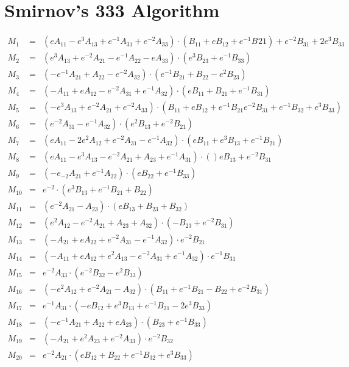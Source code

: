 \documentclass{article}
\begin{document}
\section{Smirnov's 333 Algorithm \cite{Smirnov13}}
\begin{eqnarray*}
M_1 &=& (eA_{11}-e^3A_{13}+e^{-1}A_{31}+e^{-2}A_{33})\cdot(B_{11}+eB_{12}+e^{-1}B_{}21)+e^{-2}B_{31}+2e^3B_{33}\\
M_2 &=& (e^3A_{13}+e^{-2}A_{21}-e^{-1}A_{22}-eA_{33})\cdot(e^3B_{23}+e^{-1}B_{33})\\
M_3 &=& (-e^{-1}A_{21}+A_{22}-e^{-2}A_{32})\cdot(e^{-1}B_{21}+B_{22}-e^2B_{23})\\
M_4 &=& (-A_{11}+eA_{12}-e^{-2}A_{31}+e^{-1}A_{32})\cdot(eB_{11}+B_{21}+e^{-1}B_{31})\\
M_5 &=& (-e^3A_{13}+e^{-2}A_{21}+e^{-2}A_{33})\cdot(B_{11}+eB_{12}+e^{-1}B_{21}e^{-2}B_{31}+e^{-1}B_{32}+e^3B_{33})\\
M_6 &=& (e^{-2}A_{31}-e^{-1}A_{32})\cdot(e^2B_{13}+e^{-2}B_{21})\\
M_7 &=& (eA_{11}-2e^2A_{12}+e^{-2}A_{31}-e^{-1}A_{32})\cdot(eB_{11}+e^3B_{13}+e^{-1}B_{21})\\
M_8 &=& (eA_{11}-e^3A_{13}-e^{-2}A_{21}+A_{23}+e^{-1}A_{31})\cdot()eB_{13}+e^{-2}B_{31}\\
M_9 &=& (-e_{-2}A_{21}+e^{-1}A_{22})\cdot(eB_{22}+e^{-1}B_{33})\\
M_{10} &=& e^{-2}\cdot(e^3B_{13}+e^{-1}B_{21}+B_{22})\\
M_{11} &=& (e^{-2}A_{21}-A_{23})\cdot(eB_{13}+B_{23}+B_{32})\\
M_{12} &=& (e^2A_{12}-e^{-2}A_{21}+A_{23}+A_{32})\cdot(-B_{23}+e^{-2}B_{31})\\
M_{13} &=& (-A_{21}+eA_{22}+e^{-2}A_{31}-e^{-1}A_{32})\cdot e^{-2}B_{21}\\
M_{14} &=& (-A_{11}+eA_{12}+e^2A_{13}-e^{-2}A_{31}+e^{-1}A_{32})\cdot e^{-1}B_{31}\\
M_{15} &=& e^{-2}A_{33}\cdot(e^{-2}B_{32}-e^2B_{33})\\
M_{16} &=& (-e^2A_{12}+e^{-2}A_{21}-A_{32})\cdot(B_{11}+e^{-1}B_{21}-B_{22}+e^{-2}B_{31})\\
M_{17} &=& e^{-1}A_{31}\cdot(-eB_{12}+e^3B_{13}+e^{-1}B_{21}-2e^{3}B_{33})\\
M_{18} &=& (-e^{-1}A_{21}+A_{22}+eA_{23})\cdot(B_{23}+e^{-1}B_{33})\\
M_{19} &=& (-A_{21}+e^2A_{23}+e^{-2}A_{33})\cdot e^{-2}B_{32}\\
M_{20} &=& e^{-2}A_{21}\cdot(eB_{12}+B_{22}+e^{-1}B_{32}+e^3B_{33})\\\\

\end{eqnarray*}
\end{document}
